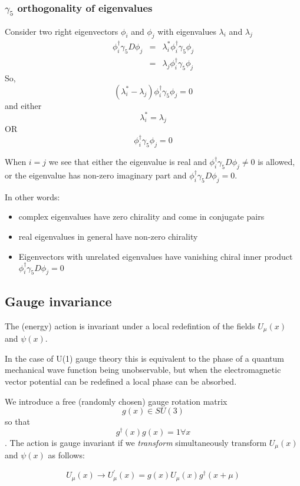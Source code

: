 \documentclass[letter,10pt]{report}
\begin{document}
\subsubsection{$\gamma_5$ orthogonality of eigenvalues}

Consider two right eigenvectors $\phi_i$ and $\phi_j$ with eigenvalues $\lambda_i$ and $\lambda_j$
\begin{eqnarray}
  \phi_i^\dagger \gamma_5 D \phi_j &=& \lambda_i^\ast \phi_i^\dagger \gamma_5 \phi_j\\
  &=& \lambda_j \phi_i^\dagger \gamma_5 \phi_j
\end{eqnarray}
So,
$$
(\lambda_i^\ast - \lambda_j)   \phi_i^\dagger \gamma_5 \phi_j = 0
$$
and either
$$
\lambda_i^\ast = \lambda_j 
$$
OR
$$
\phi_i^\dagger \gamma_5  \phi_j = 0
$$

When $i=j$ we see that either the eigenvalue is real and $\phi_i^\dagger \gamma_5 D \phi_j \ne 0$ is allowed,
or the eigenvalue has non-zero imaginary part and $\phi_i^\dagger \gamma_5 D \phi_j = 0$.

In other words:
\begin{itemize}
\item complex eigenvalues have zero chirality and come in conjugate pairs
\item real eigenvalues in general have non-zero chirality
\item Eigenvectors with unrelated eigenvalues have vanishing chiral inner product $\phi_i^\dagger \gamma_5 D \phi_j = 0$
\end{itemize}

\subsection{Gauge invariance}

The (energy) action is invariant under a local redefintion of the fields $U_\mu(x)$ and $\psi(x)$.

In the case of U(1) gauge theory this is equivalent to the phase of a quantum mechanical wave function being unobservable,
but when the electromagnetic vector potential can be redefined a local phase can be absorbed.

We introduce a free (randomly chosen) gauge rotation matrix $$g(x) \in SU(3)$$ so that $$ g^\dagger(x) g(x) = 1 \forall x$$.
The action is gauge invariant if we \emph{transform} simultaneously transform $U_\mu(x)$ and $\psi(x)$ as follows:

$$U_\mu(x) \to U_\mu^\prime(x) = g(x) U_\mu(x) g^\dagger(x+\mu)$$
\end{document}
